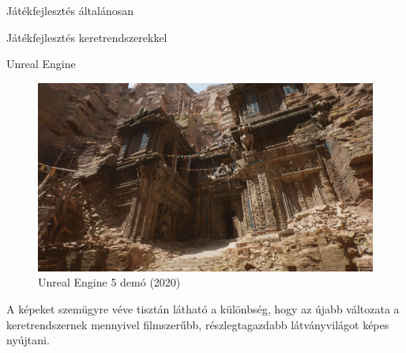 \begin{MyChapter}{Játékfejlesztés általánosan}
\begin{MySection}{Játékfejlesztés keretrendszerekkel}
\begin{MySubSection}{Unreal Engine}
\begin{figure}[h!]
			\includegraphics[scale=0.16]{kepek/unrealEngine/First-look-at-Unreal_Engine_5.jpg}
			\caption{Unreal Engine 5 demó (2020)}
			\label{fig:unrealEngine:First-look-at-Unreal_Engine_5}
		\end{figure}
	
		A képeket szemügyre véve tisztán látható a különbség, hogy az újabb változata a keretrendszernek mennyivel filmszerűbb, részlegtagazdabb látványvilágot képes nyújtani.
		\end{MySubSection}
		
		
		\end{MySection}
	
\end{MyChapter}
